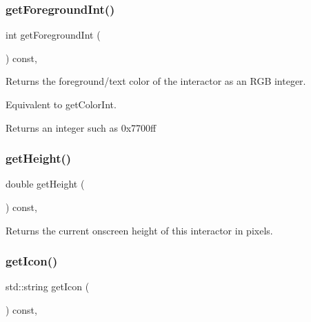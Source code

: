 \subsubsection{\texorpdfstring{get\+Foreground\+Int()}{getForegroundInt()}}
{\footnotesize\ttfamily int get\+Foreground\+Int (\begin{DoxyParamCaption}{ }\end{DoxyParamCaption}) const\hspace{0.3cm}{\ttfamily [virtual]}, {\ttfamily [inherited]}}



Returns the foreground/text color of the interactor as an R\+GB integer. 

Equivalent to get\+Color\+Int. \begin{DoxyReturn}{Returns}
an integer such as 0x7700ff 
\end{DoxyReturn}
\mbox{\label{classGInteractor_a1e7e353362434072875264cf95629f99}} 
\subsubsection{\texorpdfstring{get\+Height()}{getHeight()}}
{\footnotesize\ttfamily double get\+Height (\begin{DoxyParamCaption}{ }\end{DoxyParamCaption}) const\hspace{0.3cm}{\ttfamily [virtual]}, {\ttfamily [inherited]}}



Returns the current onscreen height of this interactor in pixels. 

\mbox{\label{classGInteractor_aaed62a73004939a64da6f0eb9eb64d73}} 
\subsubsection{\texorpdfstring{get\+Icon()}{getIcon()}}
{\footnotesize\ttfamily std\+::string get\+Icon (\begin{DoxyParamCaption}{ }\end{DoxyParamCaption}) const\hspace{0.3cm}{\ttfamily [virtual]}, {\ttfamily [inherited]}}



